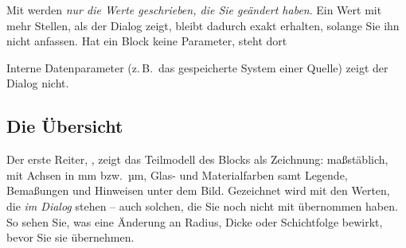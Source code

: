 Mit  werden \emph{nur die Werte geschrieben, die Sie geändert haben}. Ein Wert mit mehr
Stellen, als der Dialog zeigt, bleibt dadurch exakt erhalten, solange Sie ihn nicht anfassen. Hat
ein Block keine Parameter, steht dort 

Interne Datenparameter (z.\,B.\ das gespeicherte System einer Quelle) zeigt der Dialog nicht.

\subsection{Die Übersicht}\label{sec:workflow-uebersicht}

Der erste Reiter, , zeigt das Teilmodell des Blocks als Zeichnung: maßstäblich, mit
Achsen in mm bzw.\ µm, Glas- und Materialfarben samt Legende, Bemaßungen und Hinweisen unter dem
Bild. Gezeichnet wird mit den Werten, die \emph{im Dialog} stehen – auch solchen, die Sie noch
nicht mit  übernommen haben. So sehen Sie, was eine Änderung an Radius, Dicke oder
Schichtfolge bewirkt, bevor Sie sie übernehmen.

